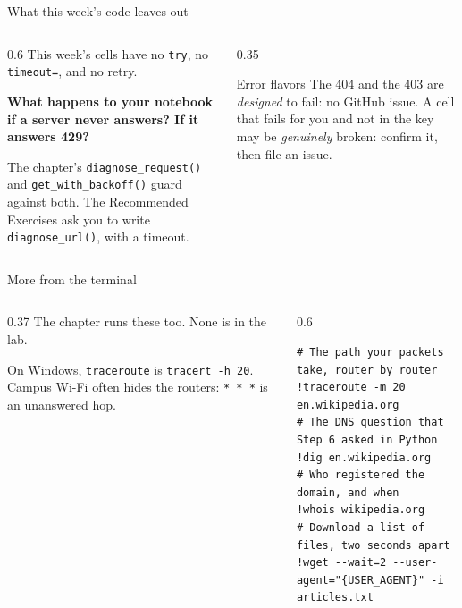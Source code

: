 \documentclass[9pt,aspectratio=169]{beamer}
\begin{document}
\begin{frame}{What this week's code leaves out}
    \begin{columns}[T]
        \begin{column}{0.6\textwidth}
            This week's cells have no \texttt{try}, no \texttt{timeout=}, and no retry.

            \medskip
            \textbf{What happens to your notebook if a server never answers? If it answers 429?}

            \medskip
            The chapter's \texttt{diagnose\_request()} and \texttt{get\_with\_backoff()} guard against both. The Recommended Exercises ask you to write \texttt{diagnose\_url()}, with a timeout.
        \end{column}
        \begin{column}{0.35\textwidth}
            \begin{alertblock}{Error flavors}
                \footnotesize The 404 and the 403 are \textit{designed} to fail: no GitHub issue. A cell that fails for you and not in the key may be \textit{genuinely} broken: confirm it, then file an issue.
            \end{alertblock}
        \end{column}
    \end{columns}
\end{frame}

\begin{frame}[fragile]{More from the terminal}
    \begin{columns}[T]
        \begin{column}{0.37\textwidth}
            The chapter runs these too. None is in the lab.

            \medskip
            On Windows, \texttt{traceroute} is \texttt{tracert -h 20}. Campus Wi-Fi often hides the routers: \texttt{* * *} is an unanswered hop.
        \end{column}
        \begin{column}{0.6\textwidth}
\begin{lstlisting}[style=lab]
# The path your packets take, router by router
!traceroute -m 20 en.wikipedia.org
# The DNS question that Step 6 asked in Python
!dig en.wikipedia.org
# Who registered the domain, and when
!whois wikipedia.org
# Download a list of files, two seconds apart
!wget --wait=2 --user-agent="{USER_AGENT}" -i articles.txt
\end{lstlisting}
        \end{column}
    \end{columns}
\end{frame}
\end{document}
